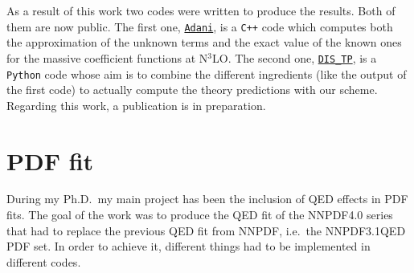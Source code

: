 \documentclass[11pt,a4paper]{moderncv}        %
\begin{document}

As a result of this work two codes were written to produce the results.
Both of them are now public.
The first one, \href{https://github.com/niclaurenti/adani}{\texttt{Adani}}, is a \texttt{C++} code 
which computes both the approximation of the unknown terms and the exact value of the known ones
for the massive coefficient functions at N$^3$LO.
%
The second one, \href{https://github.com/andreab1997/DIS_TP}{\texttt{DIS\_TP}}, is a \texttt{Python} code whose aim is to combine the different ingredients 
(like the output of the first code) to actually
compute the theory predictions with our scheme.
%
Regarding this work, a publication is in preparation.

\section{PDF fit}

During my Ph.D.\ my main project has been the inclusion of QED effects in PDF fits.
The goal of the work was to produce the QED fit of the NNPDF4.0 series that had to replace the previous QED fit from NNPDF, i.e.\ the NNPDF3.1QED PDF set.
In order to achieve it, different things had to be implemented in different codes.
\end{document}
